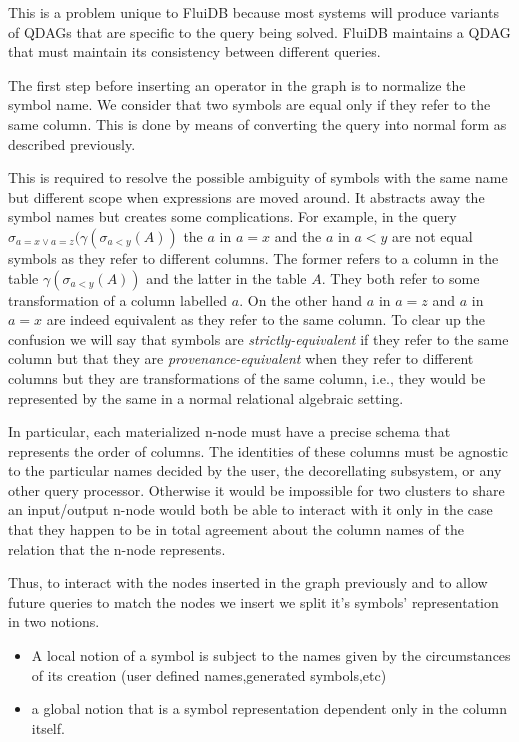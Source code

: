This is a problem unique to FluiDB because most systems will produce
variants of QDAGs that are specific to the query being solved. FluiDB maintains
a QDAG that must maintain its consistency between different queries.

The first step before inserting an operator in the graph is to
normalize the symbol name. We consider that two symbols are equal only
if they refer to the same column. This is done by means of
converting the query into normal form as described previously.

This is required to resolve the possible ambiguity of symbols with the same name but different scope
when expressions are moved around. It abstracts away the symbol
names but creates some complications. For example, in the query
\(\sigma_{a=x \lor a=z}(\gamma(\sigma_{a<y}(A))\) the \(a\) in \(a=x\)
and the \(a\) in \(a < y\) are not equal symbols as they refer to
different columns. The former refers to a column in the table
\(\gamma(\sigma_{a<y}(A))\) and the latter in the table \(A\). They
both refer to some transformation of a column labelled \(a\). On the other hand \(a\) in \(a=z\) and \(a\) in \(a=x\) are
indeed equivalent as they refer to the same column. To clear up the
confusion we will say that symbols are \emph{strictly-equivalent} if
they refer to the same column but that they are
\emph{provenance-equivalent} when they refer to different columns but
they are transformations of the same column, i.e., they would be
represented by the same in a normal relational
algebraic setting.

In particular, each materialized n-node must have a precise
schema that represents the order of columns. The identities of these
columns must be agnostic to the particular names decided by the user,
the decorellating subsystem, or any other query processor. Otherwise it
would be impossible for two clusters to share an input/output n-node
would both be able to interact with it only in the case that they
happen to be in total agreement about the column names of the relation
that the n-node represents.

Thus, to interact with the nodes inserted in the graph
previously and to allow future queries to match the nodes we insert we
split it's symbols' representation in two notions.

\begin{itemize}
\item A local notion of a symbol is subject to the names given by the
  circumstances of its creation (user defined names,generated
  symbols,etc)
\item a global notion that is a symbol representation dependent only in
  the column itself.
\end{itemize}

